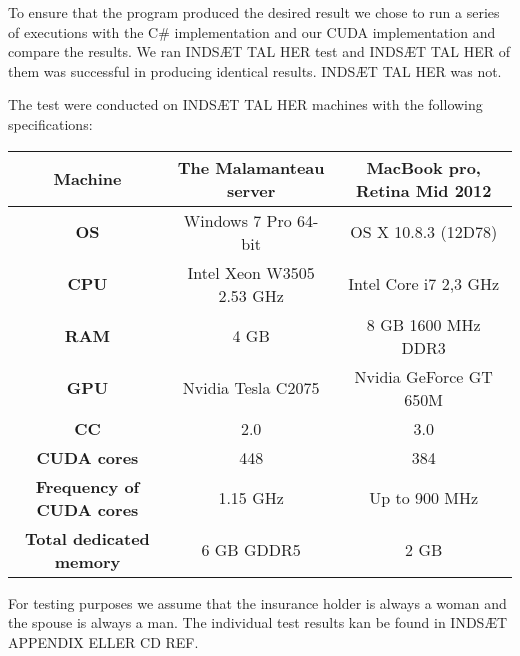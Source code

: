 To ensure that the program produced the desired result we chose to run a series of executions with the C\# implementation and our CUDA implementation and compare the results. We ran INDSÆT TAL HER test and INDSÆT TAL HER of them was successful in producing identical results. INDSÆT TAL HER was not. 

The test were conducted on INDSÆT TAL HER machines with the following specifications:

\begin{center}
\begin{tabular}{|c|c|c|}
	\hline
	\multicolumn{1}{|m{2.8cm}|}{\centering \textbf{Machine}} & The Malamanteau server & MacBook pro, Retina Mid 2012 \\ \hline
	\multicolumn{1}{|m{2.8cm}|}{\centering \textbf{OS}} & Windows 7 Pro 64-bit & OS X 10.8.3 (12D78)\\ \hline
	\multicolumn{1}{|m{2.8cm}|}{\centering \textbf{CPU}} & Intel Xeon W3505 2.53 GHz & Intel Core i7 2,3 GHz \\ \hline
	\multicolumn{1}{|m{2.8cm}|}{\centering \textbf{RAM}} & 4 GB & 8 GB 1600 MHz DDR3\\ \hline
	\multicolumn{1}{|m{2.8cm}|}{\centering \textbf{GPU}} & Nvidia Tesla C2075\cite{tesl} & Nvidia GeForce GT 650M \cite{kepl}\\ \hline
	\multicolumn{1}{|m{2.8cm}|}{\centering \textbf{CC}} & 2.0 & 3.0\\ \hline
	\multicolumn{1}{|m{2.8cm}|}{\centering \textbf{CUDA cores}} & 448 & 384\\ \hline
	\multicolumn{1}{|m{2.8cm}|}{\centering \textbf{Frequency of CUDA cores}} & 1.15 GHz & Up to 900 MHz\\ \hline
	\multicolumn{1}{|m{2.8cm}|}{\centering \textbf{Total dedicated memory}} & 6 GB GDDR5 & 2 GB\\ \hline
\end{tabular}
\end{center}

For testing purposes we assume that the insurance holder is always a woman and the spouse is always a man. The individual test results kan be found in INDSÆT APPENDIX ELLER CD REF.

